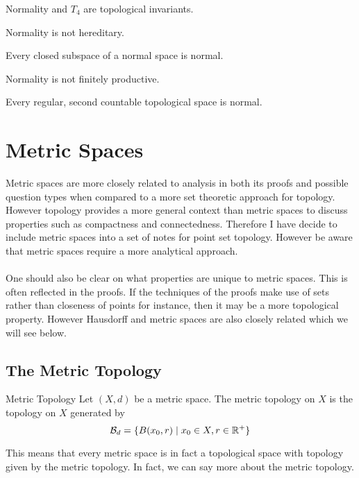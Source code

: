 \documentclass[a4paper]{article}
\begin{document}
\begin{prp}{}{} Normality and $T_4$ are topological invariants. 
\end{prp}

\begin{prp}{}{} Normality is not hereditary. 
\end{prp}

\begin{prp}{}{} Every closed subspace of a normal space is normal. 
\end{prp}

\begin{prp}{}{} Normality is not finitely productive. 
\end{prp}

\begin{thm}{}{} Every regular, second countable topological space is normal. 
\end{thm}

\pagebreak
\section{Metric Spaces}
Metric spaces are more closely related to analysis in both its proofs and possible question types when compared to a more set theoretic approach for topology. However topology provides a more general context than metric spaces to discuss properties such as compactness and connectedness. Therefore I have decide to include metric spaces into a set of notes for point set topology. However be aware that metric spaces require a more analytical approach. \\~\\
One should also be clear on what properties are unique to metric spaces. This is often reflected in the proofs. If the techniques of the proofs make use of sets rather than closeness of points for instance, then it may be a more topological property. However Hausdorff and metric spaces are also closely related which we will see below. 

\subsection{The Metric Topology}
\begin{defn}{Metric Topology}{} Let $(X,d)$ be a metric space. The metric topology on $X$ is the topology on $X$ generated by $$\mathcal{B}_d=\{B(x_0,r)\;|\;x_0\in X,r\in\mathbb{R}^+\}$$
\end{defn}

This means that every metric space is in fact a topological space with topology given by the metric topology. In fact, we can say more about the metric topology. 
\end{document}
